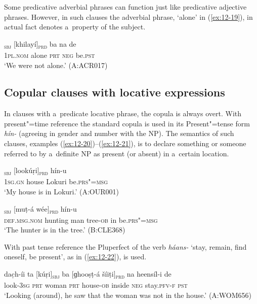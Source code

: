 Some predicative adverbial phrases can function just like predicative adjective phrases. However, in such clauses the adverbial phrase, `alone' in (\ref{ex:12-19}), in actual fact denotes a~property of the subject.

\begin{exe}
\ex
\label{ex:12-19}
\gll [be]\textsubscript{\textsc{sbj}} [khilayí]\textsubscript{\textsc{prd}} ba na de \\
\textsc{1pl.nom} alone \textsc{prt} \textsc{neg} be.\textsc{pst} \\
\glt `We were not alone.' (A:ACR017)
\end{exe}

\subsection{Copular clauses with locative expressions}
\label{subsec:12-1-3}

In clauses with a~predicate locative phrase, the copula is always overt. With present"=time reference the standard copula is used in its Present"=tense form \textit{hín-} (agreeing in gender and number with the NP). The semantics of such clauses, examples (\ref{ex:12-20})--(\ref{ex:12-21}), is to declare something or someone referred to by a~definite NP as present (or absent) in a~certain location.

\begin{exe}
\ex
\label{ex:12-20}
\textsubscript{\textsc{sbj}} [lookúṛi]\textsubscript{\textsc{prd}} hín-u \\
\textsc{1sg.gn} house Lokuri be.\textsc{prs"=msg} \\
\glt `My house is in Lokuri.' (A:OUR001)
\end{exe}
\begin{exe}
\ex
\label{ex:12-21}
\textsubscript{\textsc{sbj}} [muṭ-á wée]\textsubscript{\textsc{prd}} hín-u \\
\textsc{def.msg.nom} hunting man tree-\textsc{ob} in be.\textsc{prs"=msg} \\
\glt `The hunter is in the tree.' (B:CLE368)
\end{exe}

With past tense reference the Pluperfect of the verb \textit{háans-} `stay, remain, find oneself, be present', as in (\ref{ex:12-22}), is used.

\begin{exe}
\ex
\label{ex:12-22}
\gll dac̣h-íi ta [kúṛi]\textsubscript{\textsc{sbj}} ba [ɡhooṣṭ-á šíiṭi]\textsubscript{\textsc{prd}} na heensíl-i de \\
look-3\textsc{sg} \textsc{prt} woman \textsc{prt} house-\textsc{ob} inside \textsc{neg} stay.\textsc{pfv-f} \textsc{pst} \\
\glt `Looking (around), he saw that the woman was not in the house.' (A:WOM656)
\end{exe}

